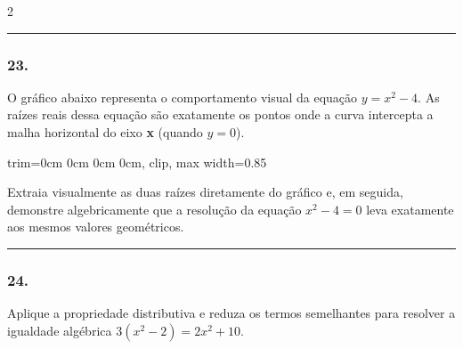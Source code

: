 \documentclass[twoside, 10pt, a4paper]{article}
\newlength{\espacoPreQuestao}\setlength{\espacoPreQuestao}{0.1cm}
\newlength{\espacoQuestao}\setlength{\espacoQuestao}{0.2cm}
\newcommand{\larguraTikz}{0.85\linewidth}
\begin{document}
\begin{multicols*}{2}
\noindent\textcolor{CorLinha}{\rule{\linewidth}{0.5pt}} 
\par\vspace{\espacoPreQuestao}
\subsubsection*{23.} O gráfico abaixo representa o comportamento visual da equação $ y = x^2 - 4 $. As raízes reais dessa equação são exatamente os pontos onde a curva intercepta a malha horizontal do eixo \textbf{x} (quando $ y = 0 $).

\begin{center}
\begin{adjustbox}{trim=0cm 0cm 0cm 0cm, clip, max width=\larguraTikz}
\end{adjustbox}
\end{center}

Extraia visualmente as duas raízes diretamente do gráfico e, em seguida, demonstre algebricamente que a resolução da equação $ x^2 - 4 = 0 $ leva exatamente aos mesmos valores geométricos.
\par\vspace{\espacoQuestao}

\noindent\textcolor{CorLinha}{\rule{\linewidth}{0.5pt}} 
\par\vspace{\espacoPreQuestao}
\subsubsection*{24.} Aplique a propriedade distributiva e reduza os termos semelhantes para resolver a igualdade algébrica $ 3(x^2 - 2) = 2x^2 + 10 $.
\par\vspace{\espacoQuestao}


\end{multicols*}
\end{document}
